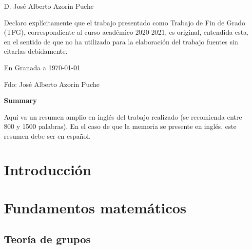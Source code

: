 \documentclass[11pt,a4paper,twoside,pdf]{article}
\numberwithin{equation}{section}
\newcommand{\miNombre}{José Alberto Azorín Puche}
\newcommand{\miCurso}{2020-2021}
\begin{document}
D. \miNombre \\\medskip

Declaro explícitamente que el trabajo presentado como Trabajo de Fin de Grado (TFG), correspondiente al curso académico \miCurso, es original, entendida esta, en el sentido de que no ha utilizado para la elaboración del trabajo fuentes sin citarlas debidamente.
\medskip

En Granada a \today
\begin{flushleft}
Fdo: \miNombre

\end{flushleft}

\vfill

\newpage

\begin{center}

{\bf Summary}
\bigskip

\begin{minipage}{0.8\linewidth}
Aquí va un resumen amplio en inglés del trabajo realizado (se recomienda entre 800 y 1500 palabras). En el caso de que la memoria se presente en inglés, este resumen debe ser en español.
\end{minipage}

\vfill

\end{center}

\newpage

\tableofcontents

\newpage

\pagestyle{fancy}
\fancyhead[RO,LE]{\rightmark}
\fancyhead[LO,RE]{\thepage}
\fancyfoot{}

\section{Introducción}

\section{Fundamentos matemáticos}

	
		\subsection{Teoría de grupos}
	
\end{document}
